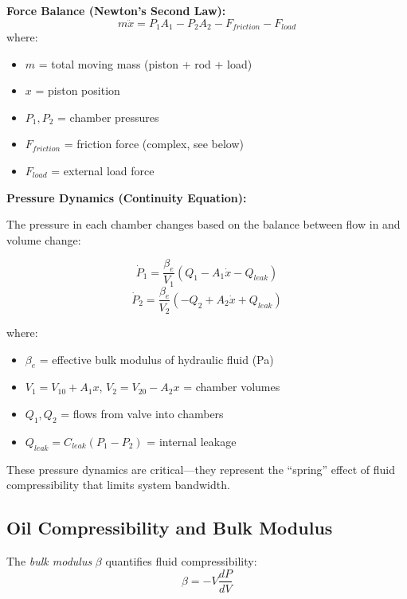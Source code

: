 \textbf{Force Balance (Newton's Second Law):}
\begin{equation}
    \boxed{m \ddot{x} = P_1 A_1 - P_2 A_2 - F_{friction} - F_{load}}
    \label{eq:hydraulic_force_balance}
\end{equation}
where:
\begin{itemize}
    \item $m$ = total moving mass (piston + rod + load)
    \item $x$ = piston position
    \item $P_1, P_2$ = chamber pressures
    \item $F_{friction}$ = friction force (complex, see below)
    \item $F_{load}$ = external load force
\end{itemize}

\textbf{Pressure Dynamics (Continuity Equation):}

The pressure in each chamber changes based on the balance between flow in and volume change:

\begin{equation}
    \boxed{\dot{P}_1 = \frac{\beta_e}{V_1}(Q_1 - A_1 \dot{x} - Q_{leak})}
    \label{eq:pressure_dynamics_1}
\end{equation}
\begin{equation}
    \boxed{\dot{P}_2 = \frac{\beta_e}{V_2}(-Q_2 + A_2 \dot{x} + Q_{leak})}
    \label{eq:pressure_dynamics_2}
\end{equation}

where:
\begin{itemize}
    \item $\beta_e$ = effective bulk modulus of hydraulic fluid (Pa)
    \item $V_1 = V_{10} + A_1 x$, $V_2 = V_{20} - A_2 x$ = chamber volumes
    \item $Q_1, Q_2$ = flows from valve into chambers
    \item $Q_{leak} = C_{leak}(P_1 - P_2)$ = internal leakage
\end{itemize}

These pressure dynamics are critical---they represent the ``spring'' effect of fluid compressibility that limits system bandwidth.

\subsection{Oil Compressibility and Bulk Modulus}

The \textit{bulk modulus} $\beta$ quantifies fluid compressibility:
\begin{equation}
    \beta = -V \frac{dP}{dV}
\end{equation}

